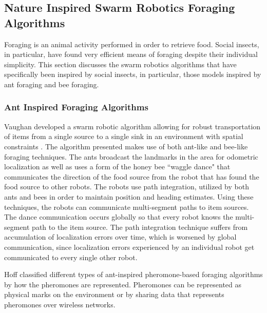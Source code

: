 

\subsection{Nature Inspired Swarm Robotics Foraging Algorithms}
\label{sec:second:natureinspiredalgs}
Foraging is an animal activity performed in order to retrieve food. Social insects, in particular, have found very efficient means of foraging despite their individual simplicity. This section discusses the swarm robotics algorithms that have specifically been inspired by social insects, in particular, those models inspired by ant foraging and bee foraging. 


\subsubsection{Ant Inspired Foraging Algorithms}
\label{sec:second:natureinspired:ant}

Vaughan developed a swarm robotic algorithm allowing for robust transportation of items from a single source to a single sink in an environment with spatial constraints \cite{vaughan2000blazing}. The algorithm presented makes use of both ant-like and bee-like foraging techniques. The ants broadcast the landmarks in the area for odometric localization as well as uses a form of the  honey bee ``waggle dance" that communicates the direction of the food source from the robot that has found the food source to other robots. The robots use path integration, utilized by both ants and bees in order to maintain position and heading estimates. Using these techniques, the robots can communicate multi-segment paths to item sources. The dance communication occurs globally so that every robot knows the multi-segment path to the item source. The path integration technique suffers from accumulation of localization errors over time, which is worsened by global communication, since localization errors experienced by an individual robot get communicated to every single other robot.


Hoff \cite{hoff2010two} classified different types of ant-inspired pheromone-based foraging algorithms by how the pheromones are represented. Pheromones can be represented as physical marks on the environment \cite{fujisawa2008communication} or by sharing data that represents pheromones over wireless networks.

